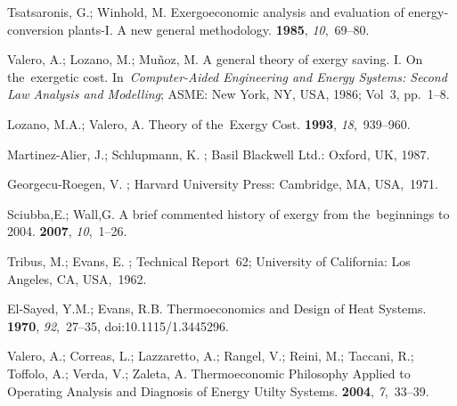 \documentclass[energies,article,accept,moreauthors,pdftex]{Definitions/mdpi}
\begin{document}
%
\begin{thebibliography}{999}
	\providecommand{\natexlab}[1]{#1}

	Tsatsaronis, G.; Winhold, M.
	\newblock Exergoeconomic analysis and evaluation of energy-conversion plants-I.
	A new general methodology.
	 {\bf 1985}, {\em 10},~69--80.

	
	Valero, A.; Lozano, M.; Muñoz, M.
	\newblock A general theory of exergy saving. I. On the~exergetic cost.
	\newblock In~{\em Computer-Aided Engineering and Energy Systems: Second Law Analysis and Modelling}; ASME: New York, NY, USA, 1986; Vol~3, pp.~1--8. 

	Lozano, M.A.; Valero, A.
	\newblock Theory of the~Exergy Cost.
	 {\bf 1993}, {\em 18},~939--960.

	Martinez-Alier, J.; Schlupmann, K.
	;
	Basil Blackwell Ltd.: Oxford, UK, 1987.

	
	Georgecu-Roegen, V.
	; Harvard
	University Press: Cambridge, MA, USA,~1971.

	
	Sciubba,E.; Wall,G.
	\newblock A brief commented history of exergy from the~beginnings to 2004.
	 {\bf 2007}, {\em
		10},~1--26.

	
	Tribus, M.; Evans, E.
	;
	\newblock Technical Report~62; University of California: Los Angeles, CA, USA,~1962.

	
	El-Sayed, Y.M.; Evans, R.B.
	\newblock Thermoeconomics and Design of Heat Systems.
	 {\bf 1970}, {\em 92},~27--35, doi:10.1115/1.3445296.

	
	Valero, A.; Correas, L.; Lazzaretto, A.; Rangel, V.; Reini, M.; Taccani, R.;
	Toffolo, A.; Verda, V.; Zaleta, A.
	\newblock Thermoeconomic Philosophy Applied to Operating Analysis and Diagnosis
	of Energy Utilty Systems.
	 {\bf 2004}, {\em 7},~33--39.


\end{thebibliography}
\end{document}
